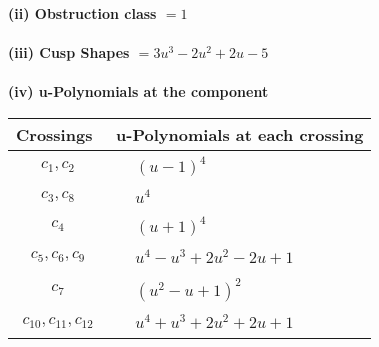 \documentclass[1p]{elsarticle_modified}
\theoremstyle{definition}
\begin{document}
\flushleft \textbf{(ii) Obstruction class $= 1$}\\~\\
\flushleft \textbf{(iii) Cusp Shapes $= 3 u^3-2 u^2+2 u-5$}\\~\\
\newpage\renewcommand{\arraystretch}{1}
\flushleft \textbf{(iv) u-Polynomials at the component}\newline \\
\begin{tabular}{m{50pt}|m{274pt}}
Crossings & \hspace{64pt}u-Polynomials at each crossing \\
\hline $$\begin{aligned}c_{1},c_{2}\end{aligned}$$&$\begin{aligned}
&(u-1)^4
\end{aligned}$\\
\hline $$\begin{aligned}c_{3},c_{8}\end{aligned}$$&$\begin{aligned}
&u^4
\end{aligned}$\\
\hline $$\begin{aligned}c_{4}\end{aligned}$$&$\begin{aligned}
&(u+1)^4
\end{aligned}$\\
\hline $$\begin{aligned}c_{5},c_{6},c_{9}\end{aligned}$$&$\begin{aligned}
&u^4- u^3+2 u^2-2 u+1
\end{aligned}$\\
\hline $$\begin{aligned}c_{7}\end{aligned}$$&$\begin{aligned}
&(u^2- u+1)^2
\end{aligned}$\\
\hline $$\begin{aligned}c_{10},c_{11},c_{12}\end{aligned}$$&$\begin{aligned}
&u^4+u^3+2 u^2+2 u+1
\end{aligned}$\\
\hline
\end{tabular}\\~\\
\end{document}
